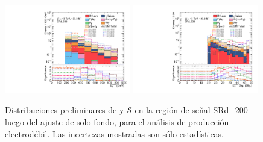 \begin{figure}[ht!]
  \centering

    \includegraphics[width=0.49\textwidth]{images/analysis_EWK/v192_2_nosyst/can_SRd_200_met_et_afterFit.pdf}
    \includegraphics[width=0.49\textwidth]{images/analysis_EWK/v192_2_nosyst/can_SRd_200_met_sig_obj_afterFit.pdf}

    \caption{Distribuciones preliminares de \met y $\mathcal{S}$ en la región de señal SRd\_200 luego del ajuste de solo fondo, para el análisis de producción electrodébil. Las incertezas mostradas son sólo estadísticas.}
    \label{fig:srd_ewk}

\end{figure}

